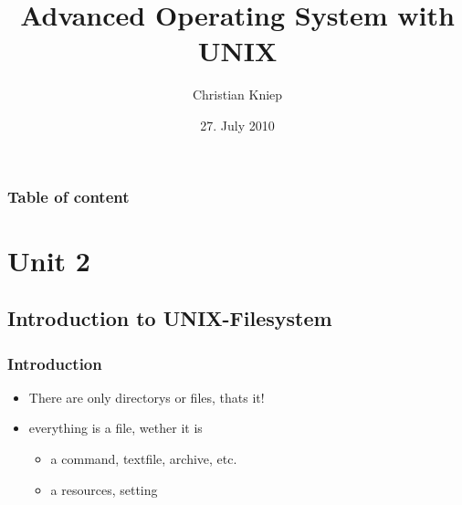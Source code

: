 \documentclass[draft,handout]{beamer}
\author{Christian Kniep}
\begin{document}
\title[UNIX]{Advanced Operating System with UNIX}  
\date[27.07.2010]{27. July 2010} 

\begin{frame}
	\titlepage
\end{frame} 

\begin{frame}
	\frametitle{Table of content}
	\tableofcontents
\end{frame} 


\section{Unit 2} 
	\subsection{Introduction to UNIX-Filesystem}
		\begin{frame}
			\frametitle{Introduction}
			\begin{itemize}
				\item<2-> There are only directorys or files, thats it!
                \item<3-> everything is a file, wether it is
                \begin{itemize}
                    \item<4-> a command, textfile, archive, etc.
                    \item<5-> a resources, setting
                \end{itemize}
            \end{itemize}
		\end{frame}
\end{document}
